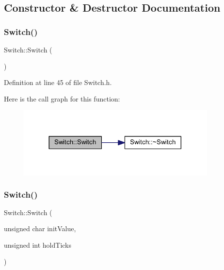 \subsection{Constructor \& Destructor Documentation}
\mbox{\label{class_switch_a54db96db46113c6a4904553796d183ce}} 
\subsubsection{\texorpdfstring{Switch()}{Switch()}\hspace{0.1cm}{\footnotesize\ttfamily [1/3]}}
{\footnotesize\ttfamily Switch\+::\+Switch (\begin{DoxyParamCaption}{ }\end{DoxyParamCaption})\hspace{0.3cm}{\ttfamily [inline]}}



Definition at line 45 of file Switch.\+h.

Here is the call graph for this function\+:
\nopagebreak
\begin{figure}[H]
\begin{center}
\leavevmode
\includegraphics[width=284pt]{d9/d47/class_switch_a54db96db46113c6a4904553796d183ce_cgraph}
\end{center}
\end{figure}
\mbox{\label{class_switch_a44465bb81ffe5495c856653dde8fce95}} 
\subsubsection{\texorpdfstring{Switch()}{Switch()}\hspace{0.1cm}{\footnotesize\ttfamily [2/3]}}
{\footnotesize\ttfamily Switch\+::\+Switch (\begin{DoxyParamCaption}\item[{unsigned char}]{init\+Value,  }\item[{unsigned int}]{hold\+Ticks }\end{DoxyParamCaption})}



